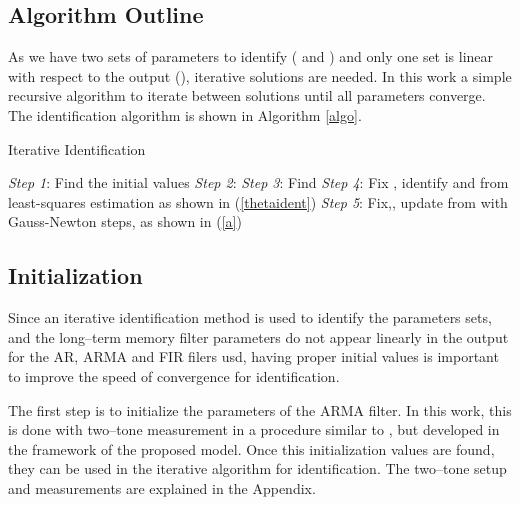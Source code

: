 \documentclass[journal]{IEEEtran}
\begin{document}
\subsection{Algorithm Outline}
As we have two sets of parameters to identify ( and ) and only one set is linear with respect to the output (), iterative solutions are needed. In this work a simple recursive algorithm to iterate between solutions until all parameters converge.  The identification algorithm is shown in Algorithm \ref{algo}.
\begin{algorithm}
                \caption{Iterative Identification}
                \label{algorithm}
                \begin{algorithmic}
                                \STATE \emph{Step 1}: Find the initial values 
                                \STATE \emph{Step 2}: 
                                \REPEAT
                                                \STATE \emph{Step 3}: Find 
                                                \STATE \emph{Step 4}: Fix , identify  and  from least-squares estimation as shown in (\ref{thetaident})
                                                \REPEAT
                                                    \STATE \emph{Step 5}: Fix,, update  from  with Gauss-Newton steps, as shown in (\ref{a})
                \end{algorithmic}
                \label{algo}
\end{algorithm}

\subsection{Initialization}
Since an iterative identification method is used to identify the parameters sets, and the long--term memory filter 
parameters do not appear linearly in the output for the AR, ARMA and FIR filers usd, having proper initial values 
is important to improve the speed of convergence for identification. 

The first step is to initialize the parameters of the ARMA
filter. In this work, this is done with two--tone measurement in a procedure similar to \cite{ku2003}, but developed
in the framework of the proposed model. Once this initialization values are found, they can be used in the iterative
algorithm for identification. The two--tone setup and measurements are explained in the Appendix. 
\end{document}
